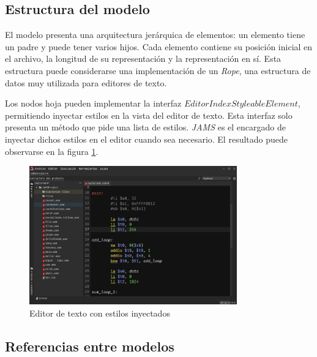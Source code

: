 \subsection{Estructura del modelo}\label{subsec:estructura-del-modelo}

El modelo presenta una arquitectura jerárquica de elementos:
un elemento tiene un padre y puede tener varios hijos.
Cada elemento contiene su posición inicial en el archivo, la
longitud de su representación y la representación en sí.
Esta estructura puede considerarse una implementación de un
\textit{Rope}\cite{ROPES}, una estructura de datos muy
utilizada para editores de texto.

\begin{center}
\end{center}

Los nodos hoja pueden implementar la interfaz
$EditorIndexStyleableElement$, permitiendo inyectar
estilos en la vista del editor de texto.
Esta interfaz solo presenta un método que pide una lista
de estilos.
\textit{JAMS} es el encargado de inyectar dichos estilos
en el editor cuando sea necesario.
El resultado puede observarse en la figura \ref{fig:jams-editor-texto}.

\begin{figure}[h]
    \centering
    \includegraphics[width=0.8\textwidth]{images/base/jams-text-editor}
    \caption{Editor de texto con estilos inyectados}
    \label{fig:jams-editor-texto}
\end{figure}

\subsection{Referencias entre modelos}\label{subsec:referencias-entre-modelos}

